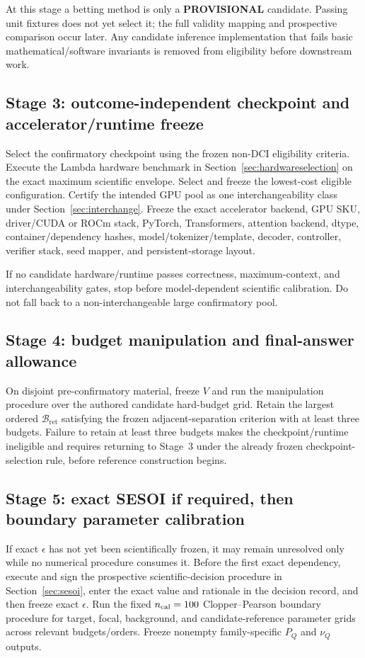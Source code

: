 \documentclass[11pt,a4paper]{article}
\newcommand{\PROV}{\textbf{PROVISIONAL}}
\newcommand{\Bret}{\mathcal B_{\mathrm{ret}}}
\begin{document}
At this stage a betting method is only a \PROV{} candidate. Passing unit fixtures does not yet select it; the full validity mapping and prospective comparison occur later. Any candidate inference implementation that fails basic mathematical/software invariants is removed from eligibility before downstream work.

\subsection{Stage 3: outcome-independent checkpoint and accelerator/runtime freeze}
Select the confirmatory checkpoint using the frozen non-DCI eligibility criteria. Execute the Lambda hardware benchmark in Section~\ref{sec:hardwareselection} on the exact maximum scientific envelope. Select and freeze the lowest-cost eligible configuration. Certify the intended GPU pool as one interchangeability class under Section~\ref{sec:interchange}. Freeze the exact accelerator backend, GPU SKU, driver/CUDA or ROCm stack, PyTorch, Transformers, attention backend, dtype, container/dependency hashes, model/tokenizer/template, decoder, controller, verifier stack, seed mapper, and persistent-storage layout.

If no candidate hardware/runtime passes correctness, maximum-context, and interchangeability gates, stop before model-dependent scientific calibration. Do not fall back to a non-interchangeable large confirmatory pool.

\subsection{Stage 4: budget manipulation and final-answer allowance}
On disjoint pre-confirmatory material, freeze $V$ and run the manipulation procedure over the authored candidate hard-budget grid. Retain the largest ordered $\Bret$ satisfying the frozen adjacent-separation criterion with at least three budgets. Failure to retain at least three budgets makes the checkpoint/runtime ineligible and requires returning to Stage~3 under the already frozen checkpoint-selection rule, before reference construction begins.

\subsection{Stage 5: exact SESOI if required, then boundary parameter calibration}
If exact $\epsilon$ has not yet been scientifically frozen, it may remain unresolved only while no numerical procedure consumes it. Before the first exact dependency, execute and sign the prospective scientific-decision procedure in Section~\ref{sec:sesoi}, enter the exact value and rationale in the decision record, and then freeze exact $\epsilon$. Run the fixed $n_{\rm cal}=100$ Clopper--Pearson boundary procedure for target, focal, background, and candidate-reference parameter grids across relevant budgets/orders. Freeze nonempty family-specific $P_Q$ and $\nu_Q$ outputs.
\end{document}
